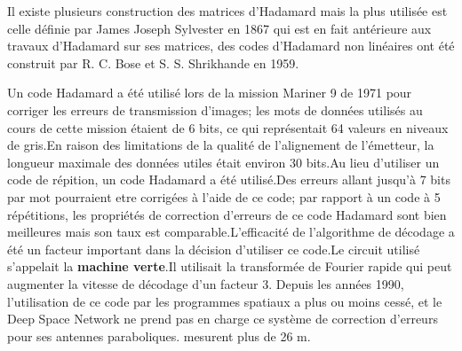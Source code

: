 \documentclass{article}
\begin{document}
Il existe plusieurs construction des matrices d'Hadamard mais la plus 
utilisée est celle définie par James Joseph Sylvester en 1867 qui est en 
fait antérieure aux travaux d'Hadamard sur ses matrices, des codes 
d'Hadamard non linéaires ont été construit par R. C. Bose et S. S. 
Shrikhande en 1959.

Un code Hadamard a été utilisé lors de la mission Mariner 9 de 1971 pour
corriger les erreurs de transmission d'images; les mots de données 
utilisés au cours de cette mission étaient de 6 bits, ce qui représentait 
64 valeurs en niveaux de gris.En raison des limitations de la qualité de 
l'alignement de l'émetteur, la longueur maximale des données utiles était 
environ 30 bits.Au lieu d'utiliser un code de répition, un code Hadamard
a été utilisé.Des erreurs allant jusqu'à 7 bits par mot pourraient etre 
corrigées à l'aide de ce code; par rapport à un code à 5 répétitions, les
propriétés de correction d'erreurs de ce code Hadamard sont bien meilleures
mais son taux est comparable.L’efficacité de l’algorithme de décodage a été
un facteur important dans la décision d’utiliser ce code.Le circuit 
utilisé s'appelait la \textbf{machine verte}.Il utilisait la transformée de
Fourier rapide qui peut augmenter la vitesse de décodage d'un facteur 3.
Depuis les années 1990, l'utilisation de ce code par les programmes 
spatiaux a plus ou moins cessé, et le Deep Space Network ne prend pas en 
charge ce système de correction d'erreurs pour ses antennes paraboliques.
mesurent plus de 26 m.
\end{document}
